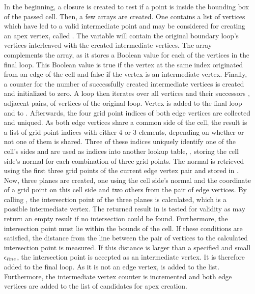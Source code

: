 %
In the beginning, a closure is created to test if a point is inside the bounding box of the passed cell.
Then, a few arrays are created.
One contains a list of vertices which have led to a valid intermediate point and may be considered for creating an apex vertex, called .
The variable  will contain the original boundary loop's vertices interleaved with the created intermediate vertices.
The  array complements the  array, as it stores a Boolean value for each of the vertices in the final loop.
This Boolean value is true if the vertex at the same index originated from an edge of the cell and false if the vertex is an intermediate vertex.
Finally, a counter for the number of successfully created intermediate vertices is created and initialized to zero.
A loop then iterates over all vertices  and their successors , \ie adjacent pairs, of vertices of the original loop.
Vertex  is added to the final loop and \True to .
Afterwards, the four grid point indices of both edge vertices are collected and uniqued.
As both edge vertices share a common side of the cell, the result is a list of grid point indices with either 4 or 3 elements, depending on whether or not one of them is shared.
Three of these indices uniquely identify one of the cell's sides and are used as indices into another lookup table, , storing the cell side's normal for each combination of three grid points. %
The normal is retrieved using the first three grid points of the current edge vertex pair and stored in .
Now, three planes are created, one using the cell side's normal and the coordinate of a grid point on this cell side and two others from the pair of edge vertices.
By calling , the intersection point of the three planes is calculated, which is a possible intermediate vertex.
The returned result in  is tested for validity as  may return an empty result if no intersection could be found.
Furthermore, the intersection point must lie within the bounds of the cell.
If these conditions are satisfied, the distance from the line between the pair of vertices to the calculated intersection point is measured.
If this distance is larger than a specified and small $\epsilon_{\mathit{line}}$, the intersection point is accepted as an intermediate vertex.
It is therefore added to the final loop.
As it is not an edge vertex, \False is added to the  list.
Furthermore, the intermediate vertex counter is incremented and both edge vertices are added to the list of candidates for apex creation.

